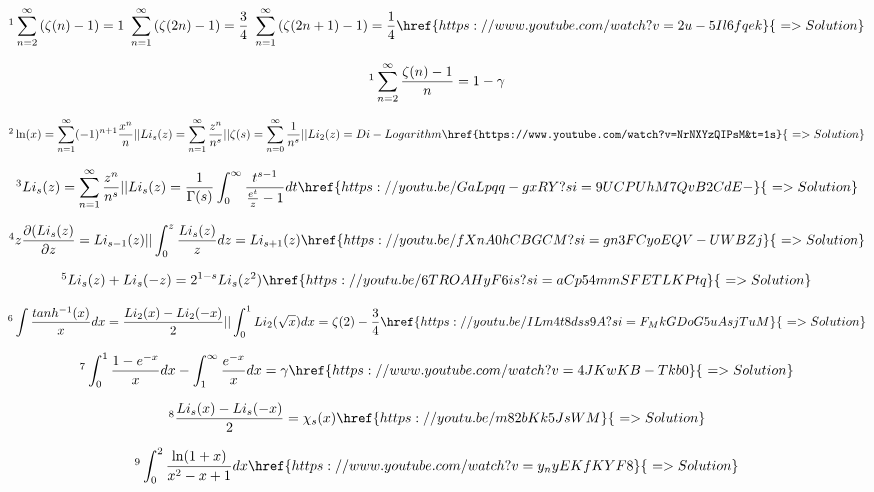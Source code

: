 \documentclass[12pt]{article}
\begin{document}
 \[ \footnote { Some fun manipulations on zeta function} \sum_{n=2}^{\infty} \left( \zeta(n) -1 \right)= 1 \,\,  \sum_{n=1}^{\infty} \left( \zeta(2n) -1 \right) = \frac{3}{4}\,\, \sum_{n=1}^{\infty} \left( \zeta(2n+1) -1 \right)  =\frac{1}{4} \href{https://www.youtube.com/watch?v=2u-5Il6fqek}{\,\, => Solution} \]
 
 \[ \footnote{ Something that involves infinite series of digamma and euler-mascheroni constant}   \sum_{n=2}^{\infty} \frac{\zeta(n)-1}{n} = 1- \gamma \]
 
 \[ \footnote{ A sweet introduction to polylogarithm} \ln(x) = \sum_{n=1}^{\infty} (-1)^{n+1} \frac{x^n}{n} || Li_s(z) = \sum_{n=1}^{\infty} \frac{z^n}{n^s} || \zeta(s) = \sum_{n=0}^{\infty} \frac{1}{n^s} || Li_2(z) = Di-Logarithm  \href{https://www.youtube.com/watch?v=NrNXYzQIPsM&t=1s}{\,\, => Solution} \] 


\[ \footnote{ Sum and Integral Representation of Polylogarithm} Li_s(z)=\sum_{n=1}^{\infty} \frac{z^n}{n^s} || Li_s(z)= \frac{1}{\Gamma(s)} \int_0^{\infty} \frac{t^{s-1}}{\frac{e^t}{z}-1} dt  \href{https://youtu.be/GaLpqq-gxRY?si=9UCPUhM7QvB2CdE-}{\,\, => Solution} \]

\[ \footnote{ Properties of Polylogarithm under  Differentiation and Integration} z \frac{\partial (Li_s(z)}{\partial z} = Li_{s-1}(z) || \int_0^z \frac{Li_s(z)}{z} dz = Li_{s+1}(z)   \href{https://youtu.be/fXnA0hCBGCM?si=gn3FCyoEQV-UWBZj}{\,\, => Solution} \]

\[ \footnote{ Reflection Property of Polylogarithm and some more ideas} Li_s(z) + Li_s(-z) = 2^{1-s} Li_s(z^2) \href{https://youtu.be/6TROAHyF6is?si=aCp54mmSFETLKPtq}{\,\, => Solution} \]
  
\[ \footnote{ Two integrals involving Di-logarithm function} \int\frac{tanh^{-1}(x)}{x} dx= \frac{Li_2(x)-Li_2(-x)}{2} || \int_0^1 Li_2(\sqrt{x}) dx = \zeta(2)- \frac{3}{4} \href{https://youtu.be/ILm4t8dss9A?si=F_MkGDoG5uAsjTuM}{\,\, => Solution} \] 

\[ \footnote{ Gauss loves the definition of e } \int_0^1 \frac{1-e^{-x}}{x}dx - \int_1^{\infty} \frac{e^{-x}}{x} dx = \gamma  \href{https://www.youtube.com/watch?v=4JKwKB-Tkb0}{\,\, => Solution} \]

\[ \footnote{ An introduction to Legendre's Chi function} \frac{Li_s(x)-Li_s(-x)}{2}= \chi_s(x) \href{https://youtu.be/m82bKk5JsWM}{\,\, => Solution} \]

\[ \footnote{ The u-substitution in this problem is unbelievable . Credit: @nicogehren6556 } \int_0^2 \frac{\ln(1+x)}{x^2-x+1}dx  \href{https://www.youtube.com/watch?v=y_nyEKfKYF8}{\,\, => Solution}  \]
\end{document}
